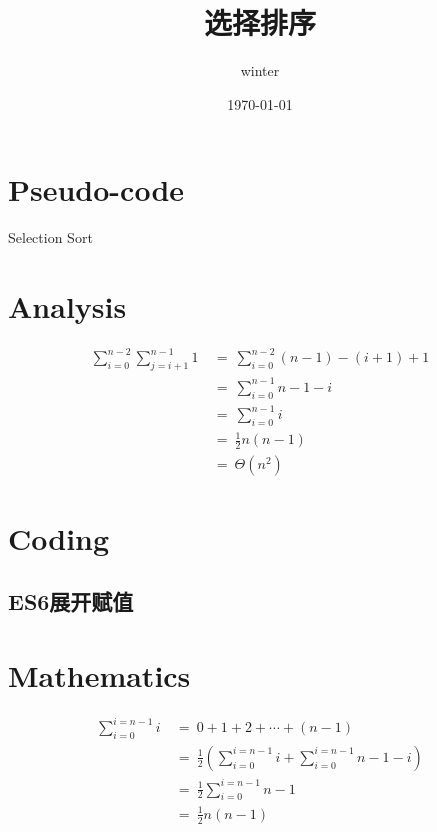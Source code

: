 \documentclass{article}
\title{\heiti 选择排序}
\author{winter}
\date{\today}
\begin{document}

\section{Pseudo-code}

\begin{algorithm}
  \caption{Selection Sort}
  \DontPrintSemicolon

\end{algorithm}

\section{Analysis}

\begin{equation*}
    \begin{split}
        \sum_{i=0}^{n-2}\sum_{j=i+1}^{n-1} 1  \ 
        &=\  \sum_{i=0}^{n-2} {(n-1)-(i+1) + 1} \\
        &=\  \sum_{i=0}^{n-1} {n-1-i} \\
        &=\  \sum_{i=0}^{n-1} i \\
        &=\  \frac{1}{2}n(n-1) \\
        &=\  \Theta(n^2)
    \end{split}
\end{equation*}

\section{Coding}

\subsection{ES6展开赋值}

\section{Mathematics}
    \begin{equation*}
        \begin{split}
            \sum_{i=0}^{i=n-1} i\ 
            &=\  0 + 1 + 2 + \cdots + (n-1)\\
            &=\  \frac{1}{2} (\sum_{i=0}^{i=n-1} i  + \sum_{i=0}^{i=n-1} n-1-i) \\
            &=\  \frac{1}{2} \sum_{i=0}^{i=n-1} n-1\\
            &=\  \frac{1}{2} n(n-1)
        \end{split}
    \end{equation*}
\end{document}
